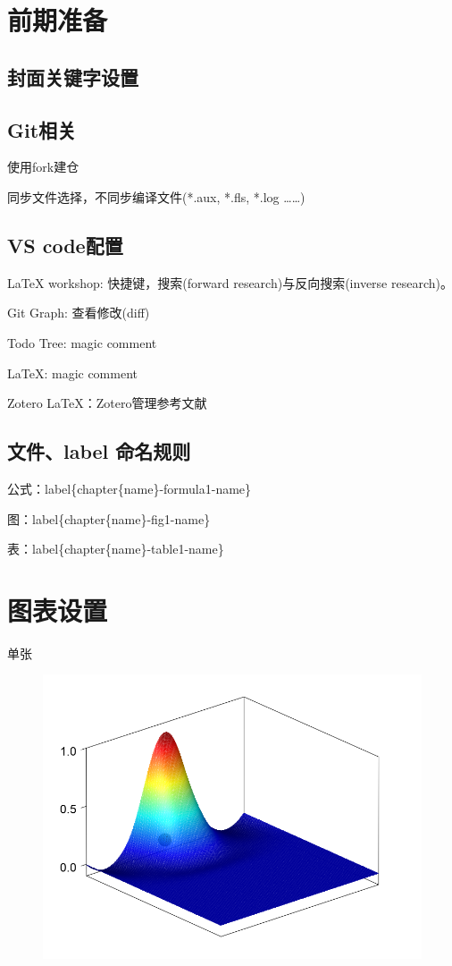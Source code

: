 \documentclass[engineeringmaster]{hquThesis}
\begin{document}
\makecover
% 
% 

\frontmatter{
    
    \tableofcontents
}

\mainmatter
\chapter{前期准备}
\section{封面关键字设置}
\section{Git相关}
使用fork建仓

同步文件选择，不同步编译文件(*.aux, *.fls, *.log ……)

\section{VS code配置}
LaTeX workshop: 快捷键，搜索(forward research)与反向搜索(inverse research)。

Git Graph: 查看修改(diff)

Todo Tree: magic comment

LaTeX: magic comment

Zotero LaTeX：Zotero管理参考文献
\section{文件、label 命名规则}
公式：label\{chapter\{name\}-formula1-name\}

图：label\{chapter\{name\}-fig1-name\}

表：label\{chapter\{name\}-table1-name\}

\chapter{图表设置}
单张
\begin{figure}[H]
    \centering
    \includegraphics[scale=0.4]{figure/1.png}
\caption{}
\label{chapter-Graphsettings-fig1-meshfree}
\end{figure}
\end{document}
